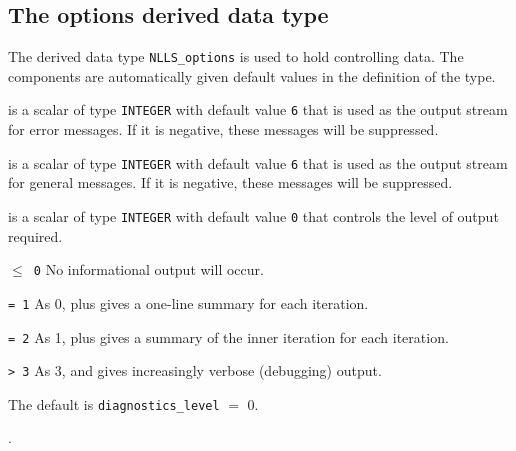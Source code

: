 \documentclass{spec}
\begin{document}
\subsection{The options derived data type}
\label{typeoptions}

The derived data type {\tt NLLS\_options}
is used to hold controlling data. The components  are automatically
given default values in the definition of the type.

\vspace{2mm}

\begin{description}

 is a scalar of type {\tt INTEGER} with default value {\tt 6} that
is used as the output stream for error messages. If it is negative, these
messages will be suppressed.

 is a scalar of type {\tt INTEGER} with default value {\tt 6}
that is used as the output stream for general messages. If it is negative, these messages will be suppressed.

 is a scalar of type {\tt INTEGER} with default value {\tt 0} that
controls the level of output required.
\begin{description}
\item{\tt $\leq$ 0} No informational output will occur.
\item{\tt = 1} As 0, plus gives a one-line summary for each iteration.
\item{\tt = 2} As 1, plus gives a summary of the inner iteration for each iteration.
\item{\tt > 3} As 3, and gives increasingly verbose (debugging) output.
\end{description}
The default is {\tt diagnostics\_level} $=$ 0.
\end{description}

.
\end{document}
